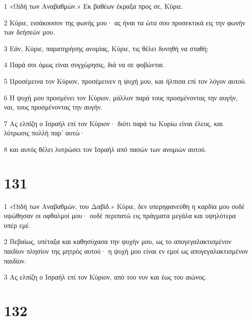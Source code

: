\par 1 «Ωιδή των Αναβαθμών.» Εκ βαθέων έκραξα προς σε, Κύριε.
\par 2 Κύριε, εισάκουσον της φωνής μου· ας ήναι τα ώτα σου προσεκτικά εις την φωνήν των δεήσεών μου.
\par 3 Εάν, Κύριε, παρατηρήσης ανομίας, Κύριε, τις θέλει δυνηθή να σταθή;
\par 4 Παρά σοι όμως είναι συγχώρησις, διά να σε φοβώνται.
\par 5 Προσέμεινα τον Κύριον, προσέμεινεν η ψυχή μου, και ήλπισα επί τον λόγον αυτού.
\par 6 Η ψυχή μου προσμένει τον Κύριον, μάλλον παρά τους προσμένοντας την αυγήν, ναι, τους προσμένοντας την αυγήν.
\par 7 Ας ελπίζη ο Ισραήλ επί τον Κύριον· διότι παρά τω Κυρίω είναι έλεος, και λύτρωσις πολλή παρ' αυτώ·
\par 8 και αυτός θέλει λυτρώσει τον Ισραήλ από πασών των ανομιών αυτού.

\chapter{131}

\par 1 «Ωιδή των Αναβαθμών, του Δαβίδ.» Κύριε, δεν υπερηφανεύθη η καρδία μου ουδέ υψώθησαν οι οφθαλμοί μου· ουδέ περιπατώ εις πράγματα μεγάλα και υψηλότερα υπέρ εμέ.
\par 2 Βεβαίως, υπέταξα και καθησύχασα την ψυχήν μου, ως το απογεγαλακτισμένον παιδίον πλησίον της μητρός αυτού· η ψυχή μου είναι εν εμοί ως απογεγαλακτισμένον παιδίον.
\par 3 Ας ελπίζη ο Ισραήλ επί τον Κύριον, από του νυν και έως του αιώνος.

\chapter{132}


